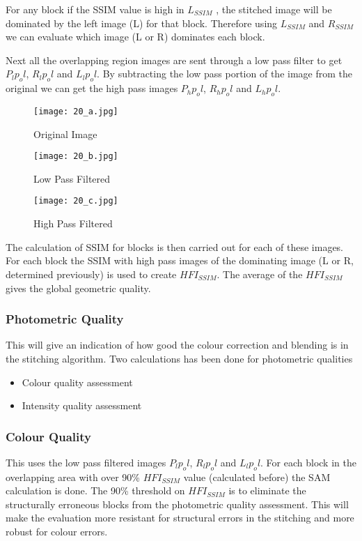 For any block if the SSIM value is high in $L_{SSIM}$ , the stitched image will be dominated by the left image (L) for that block. Therefore using $L_{SSIM}$ and $R_{SSIM}$ we can evaluate which image (L or R) dominates each block.

Next all the overlapping region images are sent through a low pass filter to get $P_lp_ol$, $R_lp_ol$ and $L_lp_ol$. By subtracting the low pass portion of the image from the original we can get the high pass images $P_hp_ol$, $R_hp_ol$ and $L_hp_ol$.

\begin{figure}[htbp]
\sidecaption
\texttt{[image: 20\_a.jpg]}
\caption{Original Image}
\label{Fig_20_original}       %
\end{figure}

\begin{figure}[htbp]
\sidecaption
\texttt{[image: 20\_b.jpg]}
\caption{Low Pass Filtered}
\label{Fig_2_low_pass}       %
\end{figure}

\begin{figure}[htbp]
\sidecaption
\texttt{[image: 20\_c.jpg]}
\caption{High Pass Filtered}
\label{Fig_2_high_pass}       %
\end{figure}

The calculation of SSIM for blocks is then carried out for each of these images. For each block the SSIM with high pass images of the dominating image (L or R, determined previously) is used to create $HFI_{SSIM}$.
The average of the $HFI_{SSIM}$ gives the global geometric quality.

\subsubsection{Photometric Quality}

This will give an indication of how good the colour correction and blending is in the stitching algorithm. Two calculations has been done for photometric qualities

\begin{itemize}
\item Colour quality assessment
\item Intensity quality assessment
\end{itemize}

\subsubsection{Colour Quality}
This uses the low pass filtered images $P_lp_ol$, $R_lp_ol$ and $L_lp_ol$.
For each block in the overlapping area with over 90\% $HFI_{SSIM}$ value (calculated before) the SAM calculation is done. 
The 90\% threshold on $HFI_{SSIM}$ is to eliminate the structurally erroneous blocks from the photometric quality assessment. This will make the evaluation more resistant for structural errors in the stitching and more robust for colour errors.

